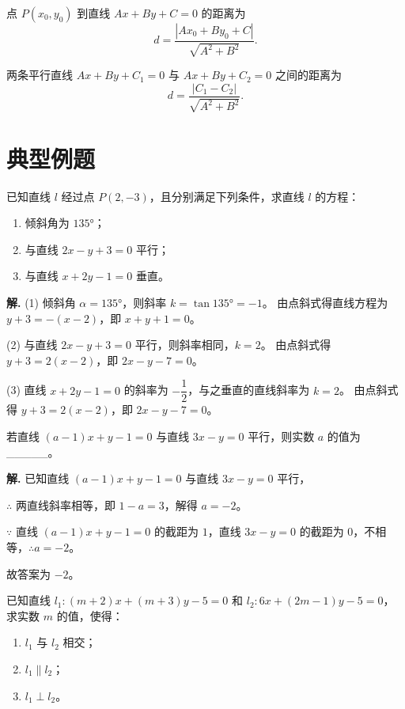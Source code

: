 \documentclass[11pt]{ctexrep}
\begin{document}
\begin{property}[点到直线的距离]
    点 $P(x_0, y_0)$ 到直线 $Ax + By + C = 0$ 的距离为
    \[
        d = \frac{|Ax_0 + By_0 + C|}{\sqrt{A^2 + B^2}}.
    \]
    
    两条平行直线 $Ax + By + C_1 = 0$ 与 $Ax + By + C_2 = 0$ 之间的距离为
    \[
        d = \frac{|C_1 - C_2|}{\sqrt{A^2 + B^2}}.
    \]
\end{property}

\section*{典型例题}

\begin{example}[求直线方程]
    已知直线 $l$ 经过点 $P(2, -3)$，且分别满足下列条件，求直线 $l$ 的方程：
    \begin{enumerate}
        \item 倾斜角为 $135°$；
        \item 与直线 $2x - y + 3 = 0$ 平行；
        \item 与直线 $x + 2y - 1 = 0$ 垂直。
    \end{enumerate}
\end{example}

\textbf{解.} (1) 倾斜角 $\alpha = 135°$，则斜率 $k = \tan 135° = -1$。
由点斜式得直线方程为 $y + 3 = -(x - 2)$，即 $\boxed{x + y + 1 = 0}$。

(2) 与直线 $2x - y + 3 = 0$ 平行，则斜率相同，$k = 2$。
由点斜式得 $y + 3 = 2(x - 2)$，即 $\boxed{2x - y - 7 = 0}$。

(3) 直线 $x + 2y - 1 = 0$ 的斜率为 $-\dfrac{1}{2}$，与之垂直的直线斜率为 $k = 2$。
由点斜式得 $y + 3 = 2(x - 2)$，即 $\boxed{2x - y - 7 = 0}$。

\begin{realexam}[2026 奉贤二模]
    若直线 $(a - 1)x + y - 1 = 0$ 与直线 $3x - y = 0$ 平行，则实数 $a$ 的值为\_\_\_\_\_。
\end{realexam}

\textbf{解.} 已知直线 $(a - 1)x + y - 1 = 0$ 与直线 $3x - y = 0$ 平行，

$\therefore$ 两直线斜率相等，即 $1 - a = 3$，解得 $a = -2$。

$\because$ 直线 $(a - 1)x + y - 1 = 0$ 的截距为 $1$，直线 $3x - y = 0$ 的截距为 $0$，不相等，$\therefore a = -2$。

故答案为 $\boxed{-2}$。

\begin{example}[直线位置关系的判定]
    已知直线 $l_1: (m + 2)x + (m + 3)y - 5 = 0$ 和 $l_2: 6x + (2m - 1)y - 5 = 0$，求实数 $m$ 的值，使得：
    \begin{enumerate}
        \item $l_1$ 与 $l_2$ 相交；
        \item $l_1 \parallel l_2$；
        \item $l_1 \perp l_2$。
    \end{enumerate}
\end{example}
\end{document}
